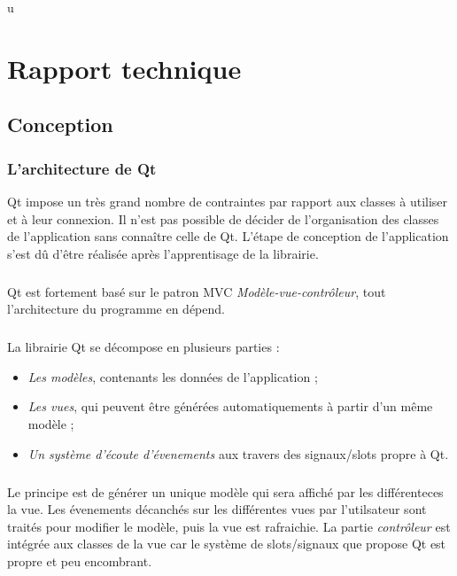 u\chapter{Rapport technique}

\section{Conception}

\subsection{L'architecture de Qt}

Qt impose un très grand nombre de contraintes par rapport aux classes à utiliser et à leur connexion.
Il n'est pas possible de décider de l'organisation des classes de l'application sans connaître celle de Qt.
L'étape de conception de l'application s'est dû d'être réalisée après l'apprentisage de la librairie.
\paragraph{}

Qt est fortement basé sur le patron MVC \emph{Modèle-vue-contrôleur}, tout l'architecture du programme en dépend.
\paragraph{}

La librairie Qt se décompose en plusieurs parties :
\begin{itemize}
\item \emph{Les modèles}, contenants les données de l'application ;
\item \emph{Les vues}, qui peuvent être générées automatiquements à partir d'un même modèle ;
\item \emph{Un système d'écoute d'évenements} aux travers des signaux/slots propre à Qt.
\end{itemize}

\paragraph{}
Le principe est de générer un unique modèle qui sera affiché par les différenteces la vue.
Les évenements décanchés sur les différentes vues par l'utilsateur sont traités pour modifier le modèle, puis la vue est rafraichie.
La partie \emph{contrôleur} est intégrée aux classes de la vue car le système de slots/signaux que propose Qt est propre et peu encombrant.

